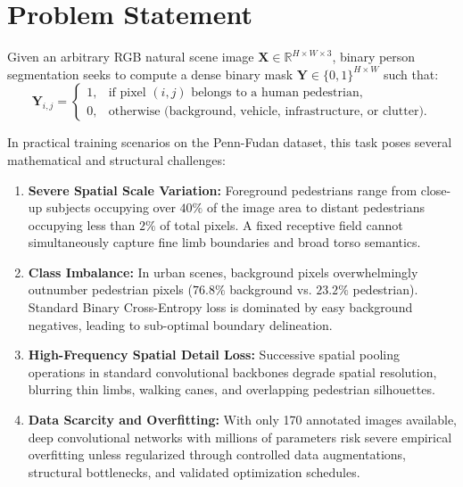 \documentclass[10pt,a4paper]{report}
\begin{document}
\section{Problem Statement}
Given an arbitrary RGB natural scene image $\mathbf{X} \in \mathbb{R}^{H \times W \times 3}$, binary person segmentation seeks to compute a dense binary mask $\mathbf{Y} \in \{0, 1\}^{H \times W}$ such that:
\begin{equation}
\mathbf{Y}_{i,j} = 
\begin{cases}
1, & \text{if pixel } (i,j) \text{ belongs to a human pedestrian}, \\
0, & \text{otherwise (background, vehicle, infrastructure, or clutter)}.
\end{cases}
\end{equation}

In practical training scenarios on the Penn-Fudan dataset, this task poses several mathematical and structural challenges:
\begin{enumerate}
    \item \textbf{Severe Spatial Scale Variation:} Foreground pedestrians range from close-up subjects occupying over $40\%$ of the image area to distant pedestrians occupying less than $2\%$ of total pixels. A fixed receptive field cannot simultaneously capture fine limb boundaries and broad torso semantics.
    \item \textbf{Class Imbalance:} In urban scenes, background pixels overwhelmingly outnumber pedestrian pixels ($76.8\%$ background vs. $23.2\%$ pedestrian). Standard Binary Cross-Entropy loss is dominated by easy background negatives, leading to sub-optimal boundary delineation.
    \item \textbf{High-Frequency Spatial Detail Loss:} Successive spatial pooling operations in standard convolutional backbones degrade spatial resolution, blurring thin limbs, walking canes, and overlapping pedestrian silhouettes.
    \item \textbf{Data Scarcity and Overfitting:} With only 170 annotated images available, deep convolutional networks with millions of parameters risk severe empirical overfitting unless regularized through controlled data augmentations, structural bottlenecks, and validated optimization schedules.
\end{enumerate}
\end{document}
